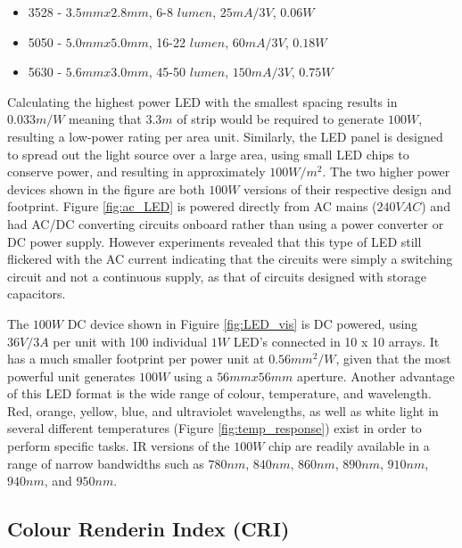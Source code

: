 \documentclass[fleqn,twoside,12pt]{report}
\begin{document}
\begin{itemize}
	\item 3528 - $3.5mm x 2.8mm$, 6-8 $lumen$, $25mA/3V$, $0.06W$
	\item 5050 - $5.0mm x 5.0mm$, 16-22 $lumen$, $60mA/3V$, $0.18W$
	\item 5630 - $5.6mm x 3.0mm$, 45-50 $lumen$, $150mA/3V$, $0.75W$
\end{itemize}
 
Calculating the highest power LED with the smallest spacing results in $0.033m/W$ meaning that $3.3m$ of strip would be required to generate $100W$, resulting a low-power rating per area unit. Similarly, the LED panel is designed to spread out the light source over a large area, using small LED chips to conserve power, and resulting in approximately $100W/m^2$. The two higher power devices shown in the figure are both $100W$ versions of their respective design and footprint. Figure \ref{fig:ac_LED} is powered directly from AC mains ($240VAC$) and had AC/DC converting circuits onboard rather than using a power converter or DC power supply. However experiments revealed that this type of LED still flickered with the AC current indicating that the circuits were simply a switching circuit and not a continuous supply, as that of circuits designed with storage capacitors. 

The $100W$ DC device shown in Figuire \ref{fig:LED_vis} is DC powered, using $36V/3A$ per unit with 100 individual $1W$ LED's connected in 10 x 10 arrays. It has a much smaller footprint per power unit at $0.56mm^2/W$, given that the most powerful unit generates $100W$ using a $56mmx56mm$ aperture. Another advantage of this LED format is the wide range of colour, temperature, and wavelength. Red, orange, yellow, blue, and ultraviolet wavelengths, as well as white light in several different temperatures (Figure \ref{fig:temp_response}) exist in order to perform specific tasks. IR versions of the $100W$ chip are readily available in a range of narrow bandwidths such as $780nm$, $840nm$, $860nm$, $890nm$, $910nm$, $940nm$, and $950nm$. 

\subsection{Colour Renderin Index (CRI)}
\end{document}
